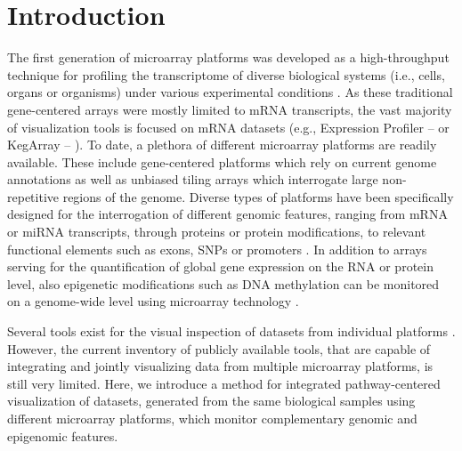 \documentclass{bioinfo}
\begin{document}
\section{Introduction}

The first generation of microarray platforms was developed as a high-throughput technique for
profiling the transcriptome of diverse biological systems (i.e., cells, organs or organisms) under
various experimental conditions \citep{Schena1995, Golub1999}. As these traditional gene-centered
arrays were mostly limited to mRNA transcripts, the vast majority of visualization tools is focused
on mRNA datasets (e.g., Expression Profiler -- \citealp{Kapushesky2004} or KegArray --
\citealp{KEGG}). To date, a plethora of different microarray platforms are readily available. These
include gene-centered platforms which rely on current genome annotations as well as unbiased tiling
arrays which interrogate large non-repetitive regions of the genome. Diverse types of platforms have
been specifically designed for the interrogation of different genomic features, ranging from mRNA or
miRNA transcripts, through proteins or protein modifications, to relevant functional elements such
as exons, SNPs or promoters \citep{Hoheisel2006}. In addition to arrays serving for the
quantification of global gene expression on the RNA or protein level, also epigenetic modifications
such as DNA methylation can be monitored on a genome-wide level using microarray technology
\citep{Schumacher2006}.

Several tools exist for the visual inspection of datasets from individual platforms \citep[see][for
some examples]{Gehlenborg2010}. However, the current inventory of publicly available tools, that are
capable of integrating and jointly visualizing data from multiple microarray platforms, is still
very limited.  Here, we introduce a method for integrated pathway-centered visualization of
datasets, generated from the same biological samples using different microarray platforms, which
monitor complementary genomic and epigenomic features.
\end{document}

